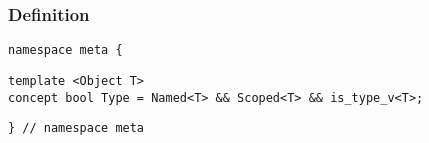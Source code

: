 
\subsubsection{Definition}

\begin{verbatim}
namespace meta {
\end{verbatim}
\begin{verbatim}
template <Object T>
concept bool Type = Named<T> && Scoped<T> && is_type_v<T>;

\end{verbatim}
\begin{verbatim}
} // namespace meta
\end{verbatim}
